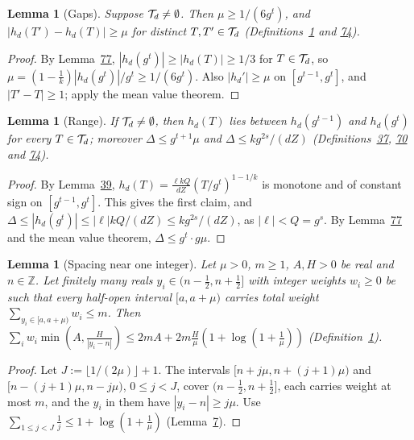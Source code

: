\documentclass[11pt]{article}
\newcounter{hffc}
\theoremstyle{definition}\newtheorem{hffdef}[hffc]{Definition}
\theoremstyle{plain}\newtheorem{hfflem}[hffc]{Lemma}\newtheorem{hffthm}[hffc]{Theorem}
\theoremstyle{remark}\newtheorem{hffrem}[hffc]{Remark}
\newcommand{\hffcost}{}
\newcommand{\setcost}[1]{\renewcommand{\hffcost}{#1}}
\newcommand{\Z}{\mathbb{Z}}\newcommand{\R}{\mathbb{R}}\newcommand{\N}{\mathbb{N}}
\begin{document}
\begin{hfflem}[Gaps]\label{L:gaps}
Suppose $\mathcal{T}_d\ne\emptyset$. Then $\mu\ge1/(6g^t)$, and $|h_d(T')-h_d(T)|\ge\mu$ for distinct $T,T'\in\mathcal{T}_d$ (Definitions~\hyperref[D:conv]{1} and \hyperref[D:curve]{74}).
\par\nopagebreak{}
\end{hfflem}
\begin{proof}\setcost{length 128/300}By Lemma~\hyperref[L:shape]{77}, $|h_d(g^t)|\ge|h_d(T)|\ge1/3$ for $T\in\mathcal{T}_d$, so $\mu=(1-\frac1k)|h_d(g^t)|/g^t\ge1/(6g^t)$. Also $|h_d'|\ge\mu$ on $[g^{t-1},g^t]$, and $|T'-T|\ge1$; apply the mean value theorem.
\end{proof}

\begin{hfflem}[Range]\label{L:range}
If $\mathcal{T}_d\ne\emptyset$, then $h_d(T)$ lies between $h_d(g^{t-1})$ and $h_d(g^t)$ for every $T\in\mathcal{T}_d$; moreover $\Delta\le g^{t+1}\mu$ and $\Delta\le kg^{2s}/(dZ)$ (Definitions~\hyperref[D:phase]{37}, \hyperref[D:count]{70} and \hyperref[D:curve]{74}).
\par\nopagebreak{}
\end{hfflem}
\begin{proof}\setcost{length 180/300}By Lemma~\hyperref[L:delta]{39}, $h_d(T)=\frac{\ell kQ}{dZ}(T/g^t)^{1-1/k}$ is monotone and of constant sign on $[g^{t-1},g^t]$. This gives the first claim, and $\Delta\le|h_d(g^t)|\le|\ell|kQ/(dZ)\le kg^{2s}/(dZ)$, as $|\ell|<Q=g^s$. By Lemma~\hyperref[L:shape]{77} and the mean value theorem, $\Delta\le g^t\cdot g\mu$.
\end{proof}

\begin{hfflem}[Spacing near one integer]\label{L:space1}
Let $\mu>0$, $m\ge1$, $A,H>0$ be real and $n\in\Z$. Let finitely many reals $y_i\in(n-\frac12,n+\frac12]$ with integer weights $w_i\ge0$ be such that every half-open interval $[a,a+\mu)$ carries total weight $\sum_{y_i\in[a,a+\mu)}w_i\le m$. Then $\sum_iw_i\min(A,\frac H{|y_i-n|})\le2mA+2m\frac H\mu(1+\log(1+\frac1\mu))$ (Definition~\hyperref[D:conv]{1}).
\par\nopagebreak{}
\end{hfflem}
\begin{proof}\setcost{length 170/300}Let $J:=\lfloor1/(2\mu)\rfloor+1$. The intervals $[n+j\mu,n+(j+1)\mu)$ and $[n-(j+1)\mu,n-j\mu)$, $0\le j<J$, cover $(n-\frac12,n+\frac12]$, each carries weight at most $m$, and the $y_i$ in them have $|y_i-n|\ge j\mu$. Use $\sum_{1\le j<J}\frac1j\le1+\log(1+\frac1\mu)$ (Lemma~\hyperref[L:harm1]{7}).
\end{proof}
\end{document}
